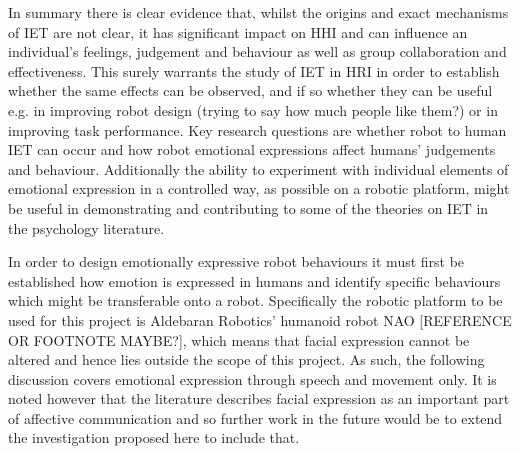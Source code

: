 \documentclass[11pt]{article}
\begin{document}
In summary there is clear evidence that, whilst the origins and exact mechanisms of IET are not clear, it has significant impact on HHI and can influence an individual's feelings, judgement and behaviour as well as group collaboration and effectiveness. This surely warrants the study of IET in HRI in order to establish whether the same effects can be observed, and if so whether they can be useful e.g. in improving robot design (trying to say how much people like them?) or in improving task performance. Key research questions are whether robot to human IET can occur and how robot emotional expressions affect humans' judgements and behaviour. Additionally the ability to experiment with individual elements of emotional expression in a controlled way, as possible on a robotic platform, might be useful in demonstrating and contributing to some of the theories on IET in the psychology literature. 

In order to design emotionally expressive robot behaviours it must first be established how emotion is expressed in humans and identify specific behaviours which might be transferable onto a robot. Specifically the robotic platform to be used for this project is Aldebaran Robotics' humanoid robot NAO [REFERENCE OR FOOTNOTE MAYBE?], which means that facial expression cannot be altered and hence lies outside the scope of this project.  As such, the following discussion covers emotional expression through speech and movement only. It is noted however that the literature describes facial expression as an important part of affective communication and so further work in the future would be to extend the investigation proposed here to include that.
\end{document}
